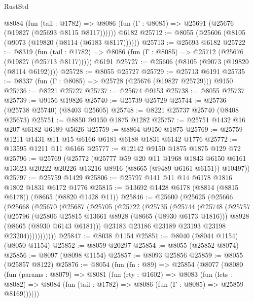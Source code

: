 \begin{lexlean}{RustStd}
\begin{coremodule}
    @8084
      (fun (tail : @1782) =>
      @8086 (fun (Γ : @8085) => @25691 (@25676 (@19827 (@25693 @8115 @8117))))))
    @6182
@25712 := @8055 (@25606 (@8105 (@9073 (@19820 (@8114 (@6183 @8117))))))
@25713 := @25693 @6182
@25722 := @8319
    (fun (tail : @1782) => @8086 (fun (Γ : @8085) => @25712 (@25676 (@19827 (@25713 @8117)))))
    @6191
@25727 := @25606 (@8105 (@9073 (@19820 (@8114 @6192))))
@25728 := @8055 @25727
@25729 := @25713 @6191
@25735 := @8337 (fun (Γ : @8085) => @25728 (@25676 (@19827 @25729))) @9150
@25736 := @8221 @25727
@25737 := @25674 @9153
@25738 := @8055 @25737
@25739 := @9156 @19826
@25740 := @25739 @25729
@25744 := @25736 (@25738 @25740) (@8403 @25605)
@25748 := @8221 @25737 @25740 (@8408 @25673)
@25751 := @8850 @9150 @1875 @1282
@25757 := @25751 @1432 @16 @207 @6182 @6189 @5626
@25759 := @8864 @9150 @1875
@25769 := @25759 @1211 @1431 @11 @15 @6166 @6181 @6188 @1831 @6142 @1776
@25772 := @13595 @1211 @11 @6166
@25777 := @12142 @9150 @1875 @1875 @129 @72
@25796 := @25769
    (@25772
      (@25777
        @59
        @20
        @11
        @1968
        @1843
        @6150
        @6161
        @13623
        @20222
        @20226
        @13216
        @8916
        (@8665 (@9489 @6161 @6151))
        @10497))
@25797 := @25759 @1429
@25806 := @25797 @141 @11 @14 @6178 @1816 @1802 @1831 @6172 @1776
@25815 := @13692 @1428 @6178 (@8814 (@8815 @6178)) (@8665 (@8820 @1428 @11))
@25846 := @25600
    (@25625
      (@25666
        (@25668
          (@25670
            (@25687
              (@25705
                (@25722
                  (@25735
                    (@25744
                      (@25748
                        (@25757
                          (@25796
                            (@25806 @25815 @13661 @8928 (@8665 (@8930 @6173 @1816)))
                            @8928
                            (@8665 (@8930 @6143 @6181)))
                          @23183
                          @23186
                          @23189
                          @23193
                          @23198
                          @23204)))))))))))
@25847 := @8038 @1154
@25851 := @8040 (@8044 @1154) (@8050 @1154)
@25852 := @8059 @20297
@25854 := @8055 (@25852 @8074)
@25856 := @8097 (@8098 @1154)
@25857 := @8093 @25856
@25859 := @8055 (@25857 @8122)
@25876 := @8054
    (fun (fn : @89) =>
    @25854
      (@8077
        (@8080
          (fun (params : @8079) =>
          @8081
            (fun (rty : @1602) =>
            @8083
              (fun (lets : @8082) =>
              @8084 (fun (tail : @1782) => @8086 (fun (Γ : @8085) => @25859 @8169))))))

\end{coremodule}
\end{lexlean}
